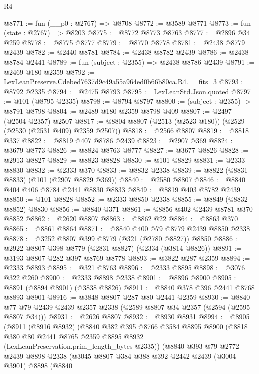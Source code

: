 \begin{lexlean}{R4}
\begin{coremodule}
@8771 := fun (__p0 : @2767) => @8708
@8772 := @3589 @8771
@8773 := fun (state : @2767) => @8203
@8775 := @8772 @8773 @8763
@8777 := @2896 @34 @259
@8778 := @8775 @8777
@8779 := @8770 @8778
@8781 := @2438 @8779 @2439
@8782 := @2440 @8781
@8784 := @2438 @8782 @2439
@8786 := @2438 @8784 @2441
@8789 := fun (subject : @2355) => @2438 @8786 @2439
@8791 := @2469 @180 @2359
@8792 := LexLeanPreserve.Cdebed7637d9c49a55a964ed0b66b80ca.R4.__fits_3
@8793 := @8792 @2335
@8794 := @2475 @8793
@8795 := LexLeanStd.Json.quoted
@8797 := @101 (@8795 @2335)
@8798 := @8794 @8797
@8800 := (subject : @2355) -> @8791 @8798
@8804 := @2489 @180 @2359 @8798 @409
@8807 := @2497 (@2504 @2357) @2507
@8817 := @8804 @8807 (@2513 (@2523 @180)) (@2529 (@2530 (@2531 @409) @2359 @2507))
@8818 := @2566 @8807
@8819 := @8818 @337
@8822 := @8819 @407 @8786 @2439
@8823 := @2907 @369
@8824 := @3679 @8773
@8826 := @8824 @8763 @8777
@8827 := @3677 @8826
@8828 := @2913 @8827
@8829 := @8823 @8828
@8830 := @101 @8829
@8831 := @2333 @8830
@8832 := @2333 @370
@8833 := @8832 @2338
@8839 := @8822 (@8831 @8833) (@101 (@2907 @8829 @369))
@8840 := @2580 @8807
@8846 := @8840 @404 @406 @8784 @2441 @8830 @8833
@8849 := @8819 @403 @8782 @2439
@8850 := @101 @8828
@8852 := @2333 @8850 @2338
@8855 := @8849 (@8832 @8852) @8830
@8856 := @8840 @371
@8861 := @8856 @402 @2439 @8781 @370 @8852
@8862 := @2620 @8807
@8863 := @8862 @22
@8864 := @8863 @370
@8865 := @8861 @8864
@8871 := @8840 @400 @79 @8779 @2439 @8850 @2338
@8878 := @3252 @8807 @399 @8779 (@321 (@2780 @8827)) @8850
@8886 := @2922 @8807 @398 @8779 (@2831 @8827) (@2334 (@3814 @8826))
@8891 := @3193 @8807 @282 @397 @8769 @8778
@8893 := @3822 @287 @2359
@8894 := @2333 @8893
@8895 := @321 @8763
@8896 := @2333 @8895
@8898 := @3076 @322 @260
@8900 := @2333 @8898 @2338
@8901 := @8896 @8900
@8905 := @8891 (@8894 @8901) (@3838 @8826)
@8911 := @8840 @378 @396 @2441 @8768 @8893 @8901
@8916 := @3848 @8807 @287 @80 @2441 @2359
@8930 := @8840 @77 @79 @2439 @2439 @2357 @2338 (@2589 @8807 @34 @2357 (@2594 (@2595 @8807 @34)))
@8931 := @2626 @8807
@8932 := @8930 @8931
@8994 := @8905
    (@8911
      (@8916 @8932)
      (@8840
        @382
        @395
        @8766
        @3584
        @8895
        @8900
        (@8818 @380 @80 @2441 @8765 @2359 @8895 @8932 (LexLeanPreservation.prim_length_bytes @2335))
        (@8840
          @393
          @79
          @2772
          @2439
          @8898
          @2338
          (@3045
            @8807
            @384
            @388
            @392
            @2442
            @2439
            (@3004 @3901)
            @8898
            (@8840

\end{coremodule}
\end{lexlean}
